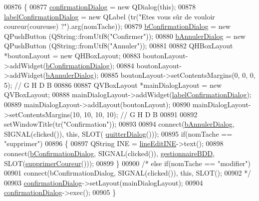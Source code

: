 \begin{DoxyCode}
00876 \{
00877     \hyperlink{class_i_h_m_gestion_cross_a417b63ff11c3be6623d17718d9058768}{confirmationDialog} = \textcolor{keyword}{new} QDialog(\textcolor{keyword}{this});
00878     \hyperlink{class_i_h_m_gestion_cross_a9b51d06493979981248ecc2641f82be4}{labelConfirmationDialog} = \textcolor{keyword}{new} QLabel (tr(\textcolor{stringliteral}{"Etes vous sûr de vouloir %
       coureur(coureuse) ?"}).arg(nomTache));
00879     \hyperlink{class_i_h_m_gestion_cross_a8aaf51ea455654df21f65ed496384b60}{bConfirmationDialog} = \textcolor{keyword}{new} QPushButton (QString::fromUtf8(\textcolor{stringliteral}{"Confirmer"}));
00880     \hyperlink{class_i_h_m_gestion_cross_a2efd604a10cae21b2f85e7196c3927fd}{bAnnulerDialog} = \textcolor{keyword}{new} QPushButton (QString::fromUtf8(\textcolor{stringliteral}{"Annuler"}));
00881 
00882     QHBoxLayout *boutonLayout = \textcolor{keyword}{new} QHBoxLayout;
00883     boutonLayout->addWidget(\hyperlink{class_i_h_m_gestion_cross_a8aaf51ea455654df21f65ed496384b60}{bConfirmationDialog});
00884     boutonLayout->addWidget(\hyperlink{class_i_h_m_gestion_cross_a2efd604a10cae21b2f85e7196c3927fd}{bAnnulerDialog});
00885     boutonLayout->setContentsMargins(0, 0, 0, 5); \textcolor{comment}{// G H D B}
00886 
00887     QVBoxLayout *mainDialogLayout = \textcolor{keyword}{new} QVBoxLayout;
00888     mainDialogLayout->addWidget(\hyperlink{class_i_h_m_gestion_cross_a9b51d06493979981248ecc2641f82be4}{labelConfirmationDialog});
00889     mainDialogLayout->addLayout(boutonLayout);
00890     mainDialogLayout->setContentsMargins(10, 10, 10, 10); \textcolor{comment}{// G H D B}
00891 
00892     setWindowTitle(tr(\textcolor{stringliteral}{"Confirmation"}));
00893 
00894     connect(\hyperlink{class_i_h_m_gestion_cross_a2efd604a10cae21b2f85e7196c3927fd}{bAnnulerDialog}, SIGNAL(clicked()), \textcolor{keyword}{this}, SLOT(
      \hyperlink{class_i_h_m_gestion_cross_a58b19fa84a16060a3dd951abeba2c543}{quitterDialog}()));
00895     \textcolor{keywordflow}{if}(nomTache == \textcolor{stringliteral}{"supprimer"})
00896     \{
00897         QString INE = \hyperlink{class_i_h_m_gestion_cross_ab6c32fd079f81c4fa0b9ec0b4ef9bb61}{lineEditINE}->text();
00898         connect(\hyperlink{class_i_h_m_gestion_cross_a8aaf51ea455654df21f65ed496384b60}{bConfirmationDialog}, SIGNAL(clicked()), 
      \hyperlink{class_i_h_m_gestion_cross_a440bac63a3e51db3e2c08e883f8cafc9}{gestionnaireBDD}, SLOT(\hyperlink{class_i_h_m_gestion_cross_a4fd00fda0e47366d66d046e344a1617e}{supprimerCoureur}()));
00899     \}
00900 \textcolor{comment}{/*    else if(nomTache == "modifier")}
00901 \textcolor{comment}{        connect(bConfirmationDialog, SIGNAL(clicked()), this, SLOT();}
00902 \textcolor{comment}{  */}
00903     \hyperlink{class_i_h_m_gestion_cross_a417b63ff11c3be6623d17718d9058768}{confirmationDialog}->setLayout(mainDialogLayout);
00904     \hyperlink{class_i_h_m_gestion_cross_a417b63ff11c3be6623d17718d9058768}{confirmationDialog}->exec();
00905 \}
\end{DoxyCode}
